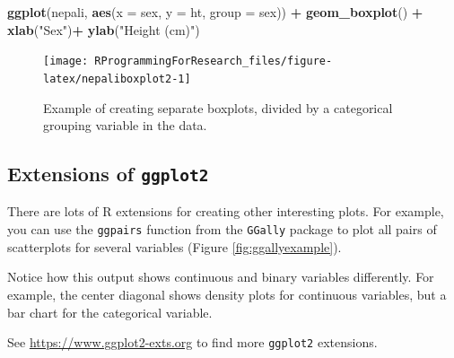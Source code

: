 \documentclass[]{book}
\makeatletter
\newenvironment{Shaded}{\begin{snugshade}}{\end{snugshade}}
\newcommand{\KeywordTok}[1]{\textcolor[rgb]{0.13,0.29,0.53}{\textbf{#1}}}
\newcommand{\DataTypeTok}[1]{\textcolor[rgb]{0.13,0.29,0.53}{#1}}
\newcommand{\StringTok}[1]{\textcolor[rgb]{0.31,0.60,0.02}{#1}}
\newcommand{\OperatorTok}[1]{\textcolor[rgb]{0.81,0.36,0.00}{\textbf{#1}}}
\newcommand{\NormalTok}[1]{#1}
\newenvironment{kframe}{%
\medskip{}
\setlength{\fboxsep}{.8em}
 \def\at@end@of@kframe{}%
 \ifinner\ifhmode%
  \def\at@end@of@kframe{\end{minipage}}%
  \begin{minipage}{\columnwidth}%
 \fi\fi%
 \def\FrameCommand##1{\hskip\@totalleftmargin \hskip-\fboxsep
 \colorbox{shadecolor}{##1}\hskip-\fboxsep
     \hskip-\linewidth \hskip-\@totalleftmargin \hskip\columnwidth}%
 \MakeFramed {\advance\hsize-\width
   \@totalleftmargin\z@ \linewidth\hsize
   \@setminipage}}%
 {\par\unskip\endMakeFramed%
 \at@end@of@kframe}
\renewenvironment{Shaded}{\begin{kframe}}{\end{kframe}}
\theoremstyle{definition}
\theoremstyle{definition}
\theoremstyle{definition}
\theoremstyle{remark}
\makeatother
\begin{document}
\begin{Shaded}
\begin{Highlighting}[]
\KeywordTok{ggplot}\NormalTok{(nepali, }\KeywordTok{aes}\NormalTok{(}\DataTypeTok{x =}\NormalTok{ sex, }\DataTypeTok{y =}\NormalTok{ ht, }\DataTypeTok{group =}\NormalTok{ sex)) }\OperatorTok{+}\StringTok{ }
\StringTok{  }\KeywordTok{geom_boxplot}\NormalTok{() }\OperatorTok{+}\StringTok{ }
\StringTok{  }\KeywordTok{xlab}\NormalTok{(}\StringTok{"Sex"}\NormalTok{)}\OperatorTok{+}\StringTok{ }\KeywordTok{ylab}\NormalTok{(}\StringTok{"Height (cm)"}\NormalTok{) }
\end{Highlighting}
\end{Shaded}

\begin{figure}

{\centering \texttt{[image: RProgrammingForResearch\_files/figure-latex/nepaliboxplot2-1]} 

}

\caption{Example of creating separate boxplots, divided by a categorical grouping variable in the data.}\label{fig:nepaliboxplot2}
\end{figure}

\subsection{\texorpdfstring{Extensions of
\texttt{ggplot2}}{Extensions of ggplot2}}\label{extensions-of-ggplot2}

There are lots of R extensions for creating other interesting plots. For
example, you can use the \texttt{ggpairs} function from the
\texttt{GGally} package to plot all pairs of scatterplots for several
variables (Figure \ref{fig:ggallyexample}).

\begin{Shaded}
\end{Shaded}

Notice how this output shows continuous and binary variables
differently. For example, the center diagonal shows density plots for
continuous variables, but a bar chart for the categorical variable.

See \url{https://www.ggplot2-exts.org} to find more \texttt{ggplot2}
extensions.
\end{document}

